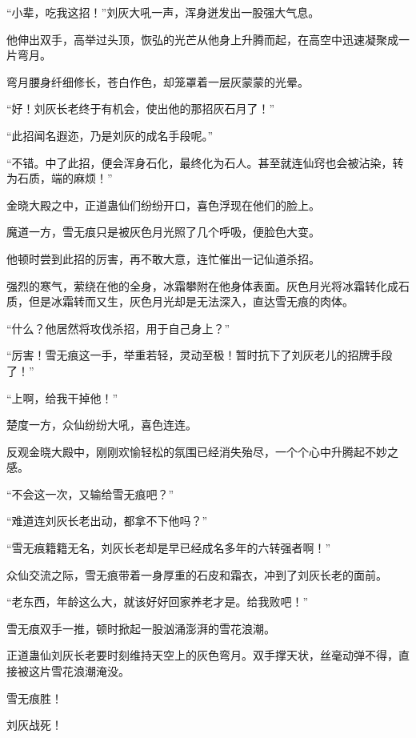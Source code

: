 
\begin{this_body}



“小辈，吃我这招！”刘灰大吼一声，浑身迸发出一股强大气息。

他伸出双手，高举过头顶，恢弘的光芒从他身上升腾而起，在高空中迅速凝聚成一片弯月。

弯月腰身纤细修长，苍白作色，却笼罩着一层灰蒙蒙的光晕。

“好！刘灰长老终于有机会，使出他的那招灰石月了！”

“此招闻名遐迩，乃是刘灰的成名手段呢。”

“不错。中了此招，便会浑身石化，最终化为石人。甚至就连仙窍也会被沾染，转为石质，端的麻烦！”

金晓大殿之中，正道蛊仙们纷纷开口，喜色浮现在他们的脸上。

魔道一方，雪无痕只是被灰色月光照了几个呼吸，便脸色大变。

他顿时尝到此招的厉害，再不敢大意，连忙催出一记仙道杀招。

强烈的寒气，萦绕在他的全身，冰霜攀附在他身体表面。灰色月光将冰霜转化成石质，但是冰霜转而又生，灰色月光却是无法深入，直达雪无痕的肉体。

“什么？他居然将攻伐杀招，用于自己身上？”

“厉害！雪无痕这一手，举重若轻，灵动至极！暂时抗下了刘灰老儿的招牌手段了！”

“上啊，给我干掉他！”

楚度一方，众仙纷纷大吼，喜色连连。

反观金晓大殿中，刚刚欢愉轻松的氛围已经消失殆尽，一个个心中升腾起不妙之感。

“不会这一次，又输给雪无痕吧？”

“难道连刘灰长老出动，都拿不下他吗？”

“雪无痕籍籍无名，刘灰长老却是早已经成名多年的六转强者啊！”

众仙交流之际，雪无痕带着一身厚重的石皮和霜衣，冲到了刘灰长老的面前。

“老东西，年龄这么大，就该好好回家养老才是。给我败吧！”

雪无痕双手一推，顿时掀起一股汹涌澎湃的雪花浪潮。

正道蛊仙刘灰长老要时刻维持天空上的灰色弯月。双手撑天状，丝毫动弹不得，直接被这片雪花浪潮淹没。

雪无痕胜！

刘灰战死！


\end{this_body}
